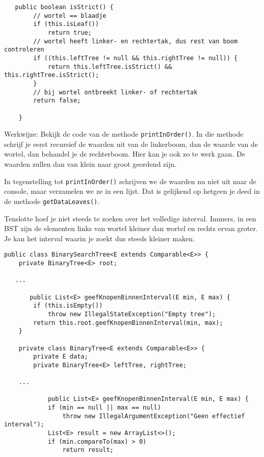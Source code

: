 \begin{Oplossing}{4.21}
\begin{lstlisting}
   public boolean isStrict() {
        // wortel == blaadje
        if (this.isLeaf())
            return true;
        // wortel heeft linker- en rechtertak, dus rest van boom controleren
        if ((this.leftTree != null && this.rightTree != null)) {
            return this.leftTree.isStrict() && this.rightTree.isStrict();
        }
        // bij wortel ontbreekt linker- of rechtertak
        return false;

    }
    \end{lstlisting}
\end{Oplossing}
\begin{Oplossing}{4.22}
Werkwijze: Bekijk de code van de methode \verb/printInOrder()/. In die methode schrijf je eerst recursief de waarden uit van de linkerboom, dan de waarde van de wortel, dan behandel je de rechterboom. Hier kan je ook zo te werk gaan. De waarden zullen dan van klein naar groot geordend zijn.

In tegenstelling tot \verb/printInOrder()/ schrijven we de waarden nu niet uit naar de console, maar verzamelen we ze in een lijst. Dat is gelijkend op hetgeen je deed in de methode \verb/getDataLeaves()/.

Tenslotte hoef je niet steeds te zoeken over het volledige interval. Immers, in een BST zijn de elementen links van wortel kleiner dan wortel en rechts ervan groter. Je kan het interval waarin je zoekt dus steeds kleiner maken.

\begin{lstlisting}
public class BinarySearchTree<E extends Comparable<E>> {
    private BinaryTree<E> root;

   ...

       public List<E> geefKnopenBinnenInterval(E min, E max) {
        if (this.isEmpty())
            throw new IllegalStateException("Empty tree");
        return this.root.geefKnopenBinnenInterval(min, max);
    }

    private class BinaryTree<E extends Comparable<E>> {
        private E data;
        private BinaryTree<E> leftTree, rightTree;

	...
	
	        public List<E> geefKnopenBinnenInterval(E min, E max) {
            if (min == null || max == null)
                throw new IllegalArgumentException("Geen effectief interval");
            List<E> result = new ArrayList<>();
            if (min.compareTo(max) > 0)
                return result;


\end{lstlisting}
\end{Oplossing}
